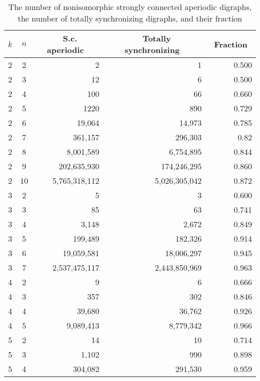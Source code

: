 \documentclass[runningheads]{llncs}
\begin{document}
\begin{table}
\caption{The number of nonisomorphic strongly connected aperiodic digraphs, the number of totally synchronizing digraphs, and their fraction}
\label{tab:exhaustive_results_2}
\begin{center}
\begin{tabular}{|c|c|r|r|r|}
  \hline                       
  $k$ & $n$ &\multicolumn{1}{c|}{\ S.c. aperiodic\ }&\multicolumn{1}{c|}{\ Totally synchronizing\ }&\multicolumn{1}{c|}{\ Fraction\ }\\ \hline\hline
  2 & 2 & 2 & 1 & 0.500 \\ \hline  
  2 & 3 & 12 & 6 & 0.500 \\ \hline  
  2 & 4 & 100 & 66 & 0.660 \\ \hline  
  2 & 5 & 1220 & 890 & 0.729 \\ \hline  
  2 & 6 & 19,064 & 14,973 & 0.785\\ \hline  
  2 & 7 & 361,157 & 296,303 & 0.82\\ \hline  
  2 & 8 & 8,001,589 & 6,754,895 & 0.844\\ \hline  
  2 & 9 & 202,635,930 & 174,246,295 & 0.860\\ \hline  
  2 & 10 & 5,765,318,112 & 5,026,305,042 & 0.872\\ \hline  
  3 & 2 & 5 & 3 & 0.600 \\ \hline     
  3 & 3 & 85 & 63 & 0.741 \\ \hline  
  3 & 4 & 3,148 & 2,672 & 0.849 \\ \hline  
  3 & 5 & 199,489 & 182,326 & 0.914 \\ \hline  
  3 & 6 & 19,059,581 & 18,006,297 & 0.945 \\ \hline  
  3 & 7 & 2,537,475,117 & 2,443,850,969 & 0.963 \\ \hline    
  4 & 2 & 9 & 6 & 0.666 \\ \hline
  4 & 3 & 357 & 302 & 0.846 \\ \hline
  4 & 4 & 39,680 & 36,762 & 0.926 \\ \hline
  4 & 5 & 9,089,413 & 8,779,342 & 0.966 \\ \hline
  5 & 2 & 14 & 10 & 0.714 \\ \hline
  5 & 3 & 1,102 & 990 & 0.898 \\ \hline
  5 & 4 & 304,082 & 291,530 & 0.959 \\ \hline
\end{tabular}
\end{center}
\end{table}
\end{document}
